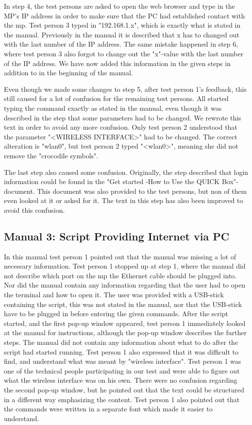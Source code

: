 In step 4, the test persons are asked to open the web browser and type in the MP's IP address in order to make sure that the PC had established contact with the \gls{mp}. Test person 3 typed in "192.168.1.x", which is exactly what is stated in the manual. Previously in the manual it is described that x has to changed out with the last number of the IP address. The same mistake happened in step 6, where test person 3 also forgot to change out the "x"-value with the last number of the IP address. We have now added this information in the given steps in addition to in the beginning of the manual. 

Even though we made some changes to step 5, after test person 1's feedback, this still caused for a lot of confusion for the remaining test persons. All started typing the command exactly as stated in the manual, even though it was described in the step that some parameters had to be changed. We rewrote this text in order to avoid any more confusion. Only test person 2 understood that the parameter "<WIRELESS INTERFACE>" had to be changed. The correct alteration is "wlan0", but test person 2 typed "<wlan0>", meaning she did not remove the "crocodile symbols".

The last step also caused some confusion. Originally, the step described that login information could be found in the "Get started -How to Use the QUICK Box"-document. This document was also provided to the test persons, but non of them even looked at it or asked for it. The text in this step has also been improved to avoid this confusion.

\subsection{Manual 3: Script Providing Internet via PC}
In this manual test person 1 pointed out that the manual was missing a lot of necessary information. Test person 1 stopped up at step 1, where the manual did not describe which port on the \gls{mp} the Ethernet cable should be plugged into. Nor did the manual contain any information regarding that the user had to open the terminal and how to open it. The user was provided with a USB-stick containing the script, this was not stated in the manual, nor that the USB-stick have to be plugged in before entering the given commands. After the script started, and the first pop-up window appeared, test person 1 immediately looked at the manual for instructions, although the pop-up window describes the further steps. The manual did not contain any information about what to do after the script had started running. Test person 1 also expressed that it was difficult to find, and understand what was meant by "wireless interface". Test person 1 was one of the technical people participating in our test and were able to figure out what the wireless interface was on his own. There were no confusion regarding the second pop-up window, but he pointed out that the text could be structured in a different way emphasizing the content.
Test person 1 also pointed out that the commands were written in a separate font which made it easier to understand. 

